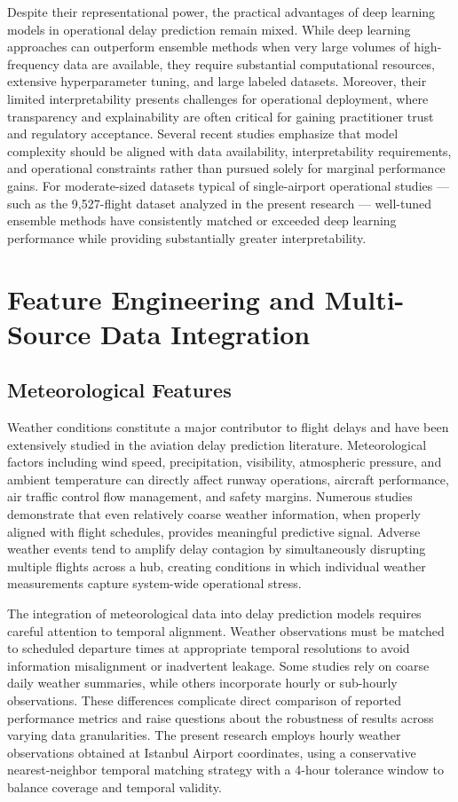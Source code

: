 \documentclass{report}
\begin{document}
Despite their representational power, the practical advantages of deep learning models in operational delay prediction remain mixed. While deep learning approaches can outperform ensemble methods when very large volumes of high-frequency data are available, they require substantial computational resources, extensive hyperparameter tuning, and large labeled datasets. Moreover, their limited interpretability presents challenges for operational deployment, where transparency and explainability are often critical for gaining practitioner trust and regulatory acceptance. Several recent studies emphasize that model complexity should be aligned with data availability, interpretability requirements, and operational constraints rather than pursued solely for marginal performance gains. For moderate-sized datasets typical of single-airport operational studies --- such as the 9,527-flight dataset analyzed in the present research --- well-tuned ensemble methods have consistently matched or exceeded deep learning performance while providing substantially greater interpretability.

\section{Feature Engineering and Multi-Source Data Integration}

\subsection{Meteorological Features}

Weather conditions constitute a major contributor to flight delays and have been extensively studied in the aviation delay prediction literature. Meteorological factors including wind speed, precipitation, visibility, atmospheric pressure, and ambient temperature can directly affect runway operations, aircraft performance, air traffic control flow management, and safety margins. Numerous studies demonstrate that even relatively coarse weather information, when properly aligned with flight schedules, provides meaningful predictive signal. Adverse weather events tend to amplify delay contagion by simultaneously disrupting multiple flights across a hub, creating conditions in which individual weather measurements capture system-wide operational stress.

The integration of meteorological data into delay prediction models requires careful attention to temporal alignment. Weather observations must be matched to scheduled departure times at appropriate temporal resolutions to avoid information misalignment or inadvertent leakage. Some studies rely on coarse daily weather summaries, while others incorporate hourly or sub-hourly observations. These differences complicate direct comparison of reported performance metrics and raise questions about the robustness of results across varying data granularities. The present research employs hourly weather observations obtained at Istanbul Airport coordinates, using a conservative nearest-neighbor temporal matching strategy with a 4-hour tolerance window to balance coverage and temporal validity.
\end{document}
